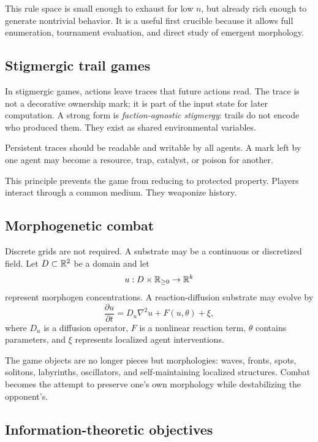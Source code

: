 This rule space is small enough to exhaust for low $n$, but already rich enough to generate nontrivial behavior. It is a useful first crucible because it allows full enumeration, tournament evaluation, and direct study of emergent morphology.

\subsection{Stigmergic trail games}\label{subsec:stigmergy}

In stigmergic games, actions leave traces that future actions read. The trace is not a decorative ownership mark; it is part of the input state for later computation. A strong form is \emph{faction-agnostic stigmergy}: trails do not encode who produced them. They exist as shared environmental variables.

\begin{principle}\label{prin:faction-agnostic}
Persistent traces should be readable and writable by all agents. A mark left by one agent may become a resource, trap, catalyst, or poison for another.
\end{principle}

This principle prevents the game from reducing to protected property. Players interact through a common medium. They weaponize history.

\subsection{Morphogenetic combat}\label{subsec:morphogenesis}

Discrete grids are not required. A substrate may be a continuous or discretized field. Let $D\subset\mathbb{R}^2$ be a domain and let
\[
  u:D\times\mathbb{R}_{\geq 0}\to \mathbb{R}^k
\]
represent morphogen concentrations. A reaction-diffusion substrate may evolve by
\[
  \frac{\partial u}{\partial t}=D_u\nabla^2u+F(u,\theta)+\xi,
\]
where $D_u$ is a diffusion operator, $F$ is a nonlinear reaction term, $\theta$ contains parameters, and $\xi$ represents localized agent interventions.

The game objects are no longer pieces but morphologies: waves, fronts, spots, solitons, labyrinths, oscillators, and self-maintaining localized structures. Combat becomes the attempt to preserve one's own morphology while destabilizing the opponent's.

\subsection{Information-theoretic objectives}\label{subsec:information}

